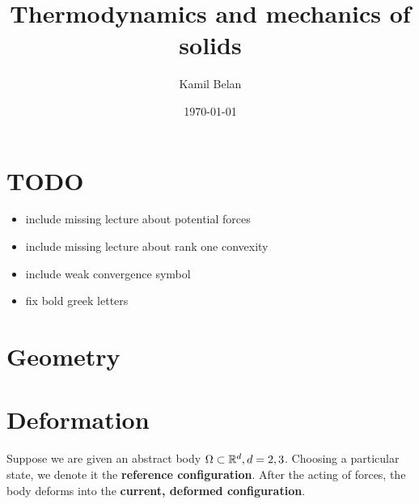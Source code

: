 \documentclass[reqno, a4paper]{article}
\begin{document}
\title{Thermodynamics and mechanics of solids}

\date{\today}

\author{Kamil Belan}



\begin{comment}
\begin{abstract}
  Here comes the abstract.
\end{abstract}
\end{comment}

\maketitle

\tableofcontents

\section{TODO}
\label{sec:todo}

\begin{itemize}
	\item include missing lecture about potential forces 
	\item include missing lecture about rank one convexity
	\item include weak convergence symbol
	\item fix bold greek letters
\end{itemize}

\section{Geometry}
\label{sec:geometry}

\section{Deformation}
\label{sec:deformation}

Suppose we are given an abstract body $\Omega \subset {\mathbb R}^d, d=2,3$. Choosing a particular state, we denote it the \textbf{reference configuration}. After the acting of forces, the body deforms into the \textbf{current, deformed configuration}. 

\end{document}
